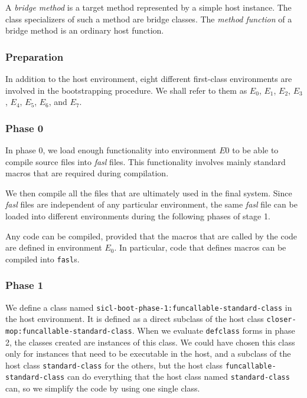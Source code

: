 \begin{definition}
A \emph{bridge method} is a target method represented by a simple host
instance.  The class specializers of such a method are bridge classes.
The \emph{method function} of a bridge method is an ordinary host
function.
\end{definition}

\subsubsection{Preparation}

In addition to the host environment, eight different \sysname{}
first-class environments are involved in the bootstrapping procedure.
We shall refer to them as $E_0$, $E_1$, $E_2$, $E_3$, $E_4$, $E_5$,
$E_6$, and $E_7$.

\subsubsection{Phase 0}

In phase $0$, we load enough functionality into environment $E0$ to be
able to compile source files into \emph{fasl} files.  This
functionality involves mainly standard macros that are required during
compilation.

We then compile all the files that are ultimately used in the final
system.  Since \emph{fasl} files are independent of any particular
environment, the same \emph{fasl} file can be loaded into different
environments during the following phases of stage 1.

Any code can be compiled, provided that the macros that are called by
the code are defined in environment $E_0$.  In particular, code that
defines macros can be compiled into \texttt{fasl}s.

\subsubsection{Phase 1}

We define a class named
\texttt{sicl-boot-phase-1:funcallable-standard-class} in the host
environment.  It is defined as a direct subclass of the host class
\texttt{closer-mop:funcallable-standard-class}.  When we
evaluate \texttt{defclass} forms in phase 2, the classes created are
instances of this class.  We could have chosen this class only for
instances that need to be executable in the host, and a subclass of
the host class \texttt{standard-class} for the others, but the host
class \texttt{funcallable-standard-class} can do everything that the
host class named \texttt{standard-class} can, so we simplify the code by
using one single class.

